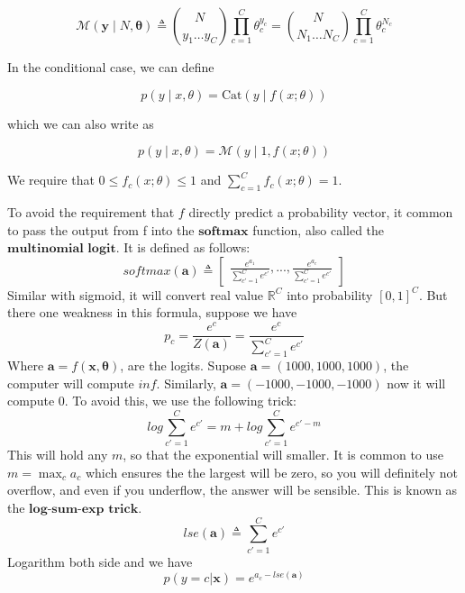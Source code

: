 \documentclass[10pt,landscape]{article}
\newcommand{\inp}{\textbf{x}}
\newcommand{\parameter}{\boldsymbol{\theta}}
\newcommand{\R}{\mathbb{R}}
\begin{document}
\begin{multicols*}{3}
\[
\mathcal{M}(\mathbf{y} \mid N, \parameter) \triangleq 
\binom{N}{y_1 \dots y_C} \prod_{c=1}^{C} \theta_c^{y_c} =
\binom{N}{N_1 \dots N_C} \prod_{c=1}^{C} \theta_c^{N_c}
\]


In the conditional case, we can define

\[
p(y \mid x, \theta) = \text{Cat}(y \mid f(x; \theta))
\]

which we can also write as

\[
p(y \mid x, \theta) = \mathcal{M}(y \mid 1, f(x; \theta))
\]

We require that \( 0 \leq f_c(x; \theta) \leq 1 \) and $
\sum_{c=1}^{C} f_c(x; \theta) = 1.$

To avoid the requirement that $f$ directly predict a probability vector, it common to pass the output from f into the $\textbf{softmax}$ function, also called the $\textbf{multinomial logit}$. It is defined as follows:
\[
    softmax(\mathbf{a})\triangleq
    \begin{bmatrix}
        \frac{e^{a_1}}{\sum_{c'=1}^{C}e^{c'}},...,
        \frac{e^{a_c}}{\sum_{c'=1}^{C}e^{c'}}
    \end{bmatrix}
\]
Similar with sigmoid, it will convert real value $\R^C$ into probability $[0,1]^C$.
But there one weakness in this formula, suppose we have
\[
    p_c=\frac{e^c}{Z(\mathbf{a})}=\frac{e^c}{\sum_{c'=1}^{C}e^{c'}}
\]
Where $\mathbf{a}=f(\inp,\parameter)$, are the logits.
Supose $\mathbf{a}=(1000,1000,1000)$, the computer will compute $inf$. Similarly, $\mathbf{a}=(-1000,-1000,-1000)$ now it will compute $0$. To avoid this, we use the following trick:
\[
    log\sum_{c'=1}^{C}e^{c'} = m +log\sum_{c'=1}^{C}e^{c'-m}
\]
This will hold any $m$, so that the exponential will smaller. It is common to use $m=\max_ca_c$ which ensures the the largest will be zero, so you will definitely not overflow, and even if you underflow, the answer will be sensible. This is known as the $\textbf{log-sum-exp trick}$.
\[
    lse(\mathbf{a})\triangleq \sum_{c'=1}^{C}e^{c'}
\]
Logarithm both side and we have
\[
    p(y=c|\inp)=e^{a_c-lse(\mathbf a)}
\]

\end{multicols*}
\end{document}

